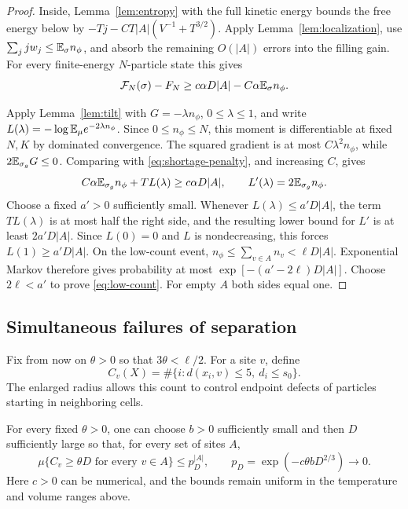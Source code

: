 \begin{proof}
Inside, Lemma~\ref{lem:entropy} with the full kinetic energy bounds
the free energy below by $-Tj-CT|A|(V^{-1}+T^{3/2})$.
Apply Lemma~\ref{lem:localization}, use
$\sum_jjw_j\le\mathbb E_\sigma n_\phi$, and absorb the remaining
$O(|A|)$ errors into the filling gain. For every finite-energy
$N$-particle state this gives
\begin{equation}\label{eq:shortage-penalty}
 \mathcal F_N(\sigma)-F_N
 \ge c\alpha D|A|-C\alpha\mathbb E_\sigma n_\phi.
\end{equation}

Apply Lemma~\ref{lem:tilt} with $G=-\lambda n_\phi$,
$0\le\lambda\le1$, and write
$L(\lambda)=-\log\mathbb E_\mu e^{-2\lambda n_\phi}$.
Since $0\le n_\phi\le N$, this moment is differentiable at fixed
$N,K$ by dominated convergence.
The squared gradient is at most $C\lambda^2n_\phi$, while
$2\mathbb E_{\sigma_g}G\le0$. Comparing with
\eqref{eq:shortage-penalty}, and increasing $C$, gives
\[
 C\alpha\mathbb E_{\sigma_g}n_\phi+TL(\lambda)
       \ge c\alpha D|A|,\qquad
 L'(\lambda)=2\mathbb E_{\sigma_g}n_\phi.
\]
Choose a fixed $a'>0$ sufficiently small. Whenever
$L(\lambda)\le a'D|A|$, the term $TL(\lambda)$ is at most
half the right side, and the resulting lower bound for $L'$ is at
least $2a'D|A|$. Since $L(0)=0$ and $L$ is nondecreasing, this
forces $L(1)\ge a'D|A|$. On the low-count event,
$n_\phi\le\sum_{v\in A}n_v<\ell D|A|$. Exponential Markov
therefore gives probability at most
$\exp[-(a'-2\ell)D|A|]$. Choose $2\ell<a'$ to prove
\eqref{eq:low-count}. For empty $A$ both sides equal one.
\end{proof}

\subsection{Simultaneous failures of separation}

Fix from now on $\theta>0$ so that $3\theta<\ell/2$. For a site
$v$, define
\begin{equation}\label{eq:close-count-definition}
 C_v(X)=\#\{i:d(x_i,v)\le5,\ d_i\le s_0\}.
\end{equation}
The enlarged radius allows this count to control endpoint defects of
particles starting in neighboring cells.

\begin{proposition}\label{prop:close-count}
For every fixed $\theta>0$, one can choose $b>0$ sufficiently small
and then $D$ sufficiently large so that, for every set of sites $A$,
\begin{equation}\label{eq:close-count-tail}
 \mu\{C_v\ge\theta D\text{ for every }v\in A\}
 \le p_D^{|A|},\qquad
 p_D=\exp(-c\theta bD^{2/3})\longrightarrow0.
\end{equation}
Here $c>0$ can be numerical, and the bounds remain uniform in the
temperature and volume ranges above.
\end{proposition}

